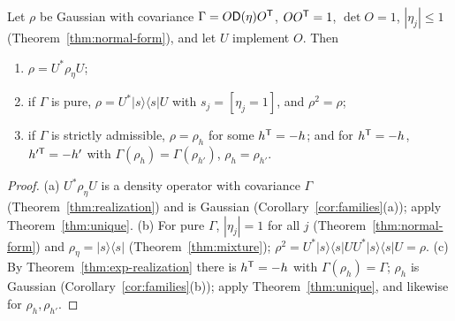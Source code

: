 \begin{corollary}\label{cor:converse}
Let $\rho$ be Gaussian with covariance $\Gamma=O\mathsf D(\eta)O^{\mathsf T}$, $OO^{\mathsf T}=1$, $\det O=1$,
$|\eta_j|\leq1$ (Theorem~\ref{thm:normal-form}), and let $U$ implement $O$. Then
\begin{enumerate}
\item[(a)] $\rho=U^*\rho_\eta U$;
\item[(b)] if $\Gamma$ is pure, $\rho=U^*|s\rangle\langle s|U$ with $s_j=[\eta_j=1]$, and
$\rho^2=\rho$;
\item[(c)] if $\Gamma$ is strictly admissible, $\rho=\rho_h$ for some $h^{\mathsf T}=-h$; and for
$h^{\mathsf T}=-h$, $h'^{\mathsf T}=-h'$ with $\Gamma(\rho_h)=\Gamma(\rho_{h'})$, $\rho_h=\rho_{h'}$.
\end{enumerate}
\end{corollary}
\begin{proof}
(a) $U^*\rho_\eta U$ is a density operator with covariance $\Gamma$
(Theorem~\ref{thm:realization}) and is Gaussian (Corollary~\ref{cor:families}(a)); apply
Theorem~\ref{thm:unique}. (b) For pure $\Gamma$, $|\eta_j|=1$ for all $j$
(Theorem~\ref{thm:normal-form}) and $\rho_\eta=|s\rangle\langle s|$ (Theorem~\ref{thm:mixture});
$\rho^2=U^*|s\rangle\langle s|UU^*|s\rangle\langle s|U=\rho$. (c) By
Theorem~\ref{thm:exp-realization} there is $h^{\mathsf T}=-h$ with $\Gamma(\rho_h)=\Gamma$; $\rho_h$ is
Gaussian (Corollary~\ref{cor:families}(b)); apply Theorem~\ref{thm:unique}, and likewise for
$\rho_h,\rho_{h'}$.
\end{proof}
